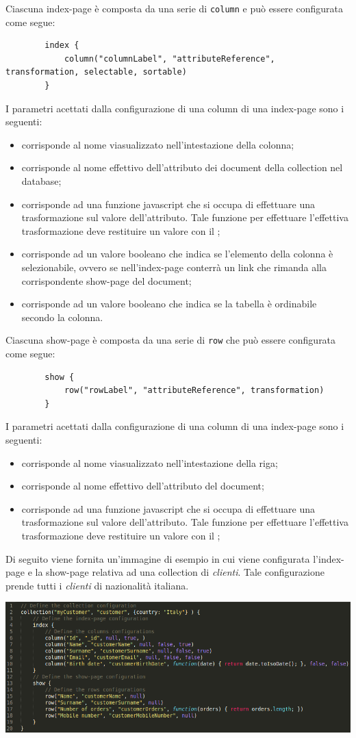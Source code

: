 Ciascuna index-page è composta da una serie di \texttt{column} e può essere configurata come segue: 
\begin{lstlisting}
		index {
			column("columnLabel", "attributeReference", transformation, selectable, sortable)
		}		
\end{lstlisting}
I parametri acettati dalla configurazione di una column di una index-page sono i seguenti: 
\begin{itemize}
\item[]  corrisponde al nome viasualizzato nell'intestazione della colonna;
\item[]  corrisponde al nome effettivo dell'attributo dei document della collection nel database;
\item[]  corrisponde ad una funzione javascript che si occupa di effettuare una trasformazione sul valore dell'attributo. Tale funzione per effettuare l'effettiva trasformazione deve restituire un valore con il ;
\item[]  corrisponde ad un valore booleano che indica se l'elemento della colonna è selezionabile, ovvero se nell'index-page conterrà un link che rimanda alla corrispondente show-page del document;
\item[]  corrisponde ad un valore booleano che indica se la tabella è ordinabile secondo la colonna.
\end{itemize}

Ciascuna show-page è composta da una serie di \texttt{row} che può essere configurata come segue: 
\begin{lstlisting}
		show {
			row("rowLabel", "attributeReference", transformation)
		}		
\end{lstlisting}
I parametri acettati dalla configurazione di una column di una index-page sono i seguenti: 
\begin{itemize}
\item[]  corrisponde al nome viasualizzato nell'intestazione della riga;
\item[]  corrisponde al nome effettivo dell'attributo del document;
\item[]  corrisponde ad una funzione javascript che si occupa di effettuare una trasformazione sul valore dell'attributo. Tale funzione per effettuare l'effettiva trasformazione deve restituire un valore con il ;
\end{itemize}

Di seguito viene fornita un'immagine di esempio in cui viene configurata l'index-page e la show-page relativa ad una collection di \textit{clienti}. Tale configurazione prende tutti i \textit{clienti} di nazionalità italiana.


\includegraphics[scale=0.5]{images/dsl-example.png} 
